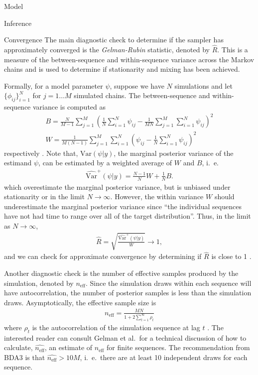 \begin{chapter}{Model}
\begin{section}{Inference}
\begin{subsection}{Convergence}
    The main diagnostic check to determine if the sampler has approximately converged
    is the \emph{Gelman-Rubin} statistic, denoted by $\hat{R}$. This is a measure of
    the between-sequence and within-sequence variance across the Markov chains and is used to determine
    if stationarity and mixing has been achieved.

    Formally, for a model parameter $\psi$, suppose we have $N$ simulations
    and let $\{\phi_{ij}\}_{i=1}^{N}$ for $j=1\dots M$ simulated chains.
    The between-sequence and within-sequence variance is computed as
    \begin{align*}
      B = \frac{N}{M-1}\sum_{j=1}^M \left(\frac{1}{N}\sum_{i=1}^N\psi_{ij} - \frac{1}{MN}\sum_{j=1}^M \sum_{i=1}^N\psi_{ij}\right)^2 \\
      W = \frac{1}{M(N-1)}\sum_{j=1}^M\sum_{i=1}^N\left(\psi_{ij} - \frac{1}{N}\sum_{i=1}^N\psi_{ij}\right)^2
    \end{align*}
    respectively \cite{bda3}.
    Note that, $\text{Var}(\psi | y)$, the marginal posterior variance of the estimand $\psi$,
    can be estimated by a weighted average of $W$ and $B$, i.\ e.\
    \begin{align*}
      \hat{\text{Var}}^+(\psi | y) = \frac{N -1}{N} W + \frac{1}{N} B.
    \end{align*}
    which overestimate the marginal posterior variance, but is unbiased under stationarity
    or in the limit $N \to \infty$. However, the within variance $W$ should underestimate
    the marginal posterior variance since ``the individual sequences have not had time to range over
    all of the target distribution''. Thus, in the limit as $N \to \infty$,
    \begin{align}\label{form:rhat}
      \hat{R} = \sqrt{\frac{\hat{\text{Var}}^+(\psi | y)}{W}} \to 1,
    \end{align}
    and we can check for approximate convergence by determining if $\hat{R}$ is close to 1 \cite{bda3}.

    Another diagnostic check is the number of effective samples produced by the simulation, denoted
    by $n_{\text{eff}}$. Since the simulation draws within each sequence will have autocorrelation,
    the number of posterior samples is less than the simulation draws. Asymptotically, the effective
    sample size is
    \begin{align}\label{form:neff}
      n_{\text{eff}} = \frac{MN}{1 + 2 \sum_{t=1}^\infty \rho_t}
    \end{align}
    where $\rho_t$ is the autocorrelation of the simulation sequence at lag $t$ \cite{bda3}.
    The interested reader can consult Gelman et al.\
    for a technical discussion of how to calculate, $\hat{n_{\text{eff}}}$, an estimate of $n_{\text{eff}}$ for finite sequences.
    The recommendation from BDA3 is that $\hat{n_{\text{eff}}} > 10 M$, i.\ e.\ there are at least 10 independent
    draws for each sequence.


\end{subsection}
\end{section}
\end{chapter}
